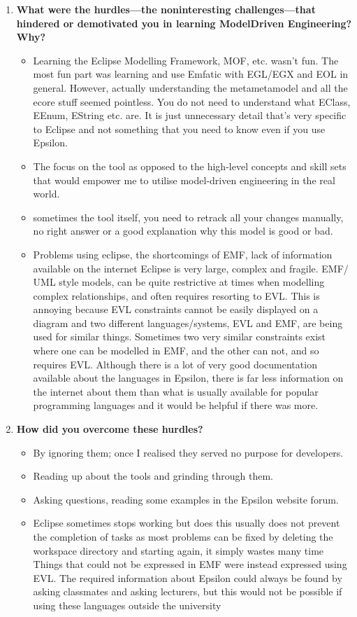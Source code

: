 \documentclass[12pt, a4paper]{report}
\begin{document}
\begin{appendices}
\begin{enumerate}
\item \textbf{ What were the hurdles---the non­interesting challenges---that hindered or demotivated you in learning Model­Driven Engineering? Why?}
\begin{itemize}
\item Learning the Eclipse Modelling Framework, MOF, etc. wasn't fun. The most fun part was learning and use Emfatic with EGL/EGX and EOL in general. However, actually understanding the meta­metamodel and all the ecore stuff seemed pointless. You do not need to understand what EClass, EEnum, EString etc. are. It is just unnecessary detail that's very specific to
Eclipse and not something that you need to know even if you use Epsilon.
\item The focus on the tool as opposed to the high-level concepts and skill sets that would empower me to utilise model-driven engineering in the real world.
\item sometimes the tool itself, you need to re­track all your changes manually, no right answer or a good explanation why this model is good or bad.
\item Problems using eclipse, the shortcomings of EMF, lack of information available on the internet Eclipse is very large, complex and fragile. EMF/ UML ­style models, can be quite restrictive at times when modelling complex relationships, and often requires resorting to EVL. This is annoying because EVL constraints cannot be easily displayed on a diagram and two different languages/systems, EVL and EMF, are being used for similar things. Sometimes two very similar constraints exist where one can be modelled in EMF, and the other can not, and so requires EVL. Although there is a lot of very good documentation available about the languages in Epsilon, there is far less information on the internet about them than what is usually available for popular programming languages and it would be helpful if there was more.
\end{itemize}

\item \textbf{How did you overcome these hurdles?}
\begin{itemize}
\item By ignoring them; once I realised they served no purpose for developers.
\item Reading up about the tools and grinding through them.
\item Asking questions, reading some examples in the Epsilon website forum.
\item Eclipse sometimes stops working but does this usually does not prevent the completion of tasks as most problems can be fixed by deleting the workspace directory and starting again, it simply wastes many time Things that could not be expressed in EMF were instead expressed using EVL. The required information about Epsilon could always be found by
asking classmates and asking lecturers, but this would not be possible if using these languages outside the university
\end{itemize}
\end{enumerate}


\end{appendices}
\end{document}
